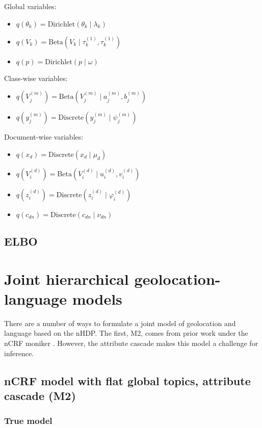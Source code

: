 \documentclass{article}
\newcommand{\Beta}{\ensuremath{\mathrm{Beta}}}
\newcommand{\Dirichlet}{\ensuremath{\mathrm{Dirichlet}}}
\newcommand{\Discrete}{\ensuremath{\mathrm{Discrete}}}
\begin{document}
Global variables:
\begin{itemize}
\item $\displaystyle q(\theta_k) = \Dirichlet(\theta_k \mid \lambda_k)$
\item $\displaystyle q(V_k) = \Beta(V_k \mid \tau_k^{(1)}, \tau_k^{(1)})$
\item $q(p) = \Dirichlet(p \mid \omega)$
\end{itemize}
Class-wise variables:
\begin{itemize}
\item $\displaystyle q(V_j^{(m)}) = \Beta(V_j^{(m)} \mid a_j^{(m)}, b_j^{(m)})$
\item $q(y_j^{(m)}) = \Discrete(y_j^{(m)} \mid \psi_j^{(m)})$
\end{itemize}
Document-wise variables:
\begin{itemize}
\item $q(x_d) = \Discrete(x_d \mid \mu_d)$
\item $\displaystyle q(V_i^{(d)}) = \Beta(V_i^{(d)} \mid u_i^{(d)}, v_i^{(d)})$
\item $q(z_i^{(d)}) = \Discrete(z_i^{(d)} \mid \varphi_i^{(d)})$
\item $\displaystyle q(c_{dn}) = \Discrete(c_{dn} \mid \nu_{dn})$
\end{itemize}


\subsection*{ELBO}



\section*{Joint hierarchical geolocation-language models}

There are a number of ways to formulate a joint model of geolocation and language based on the nHDP.  The first, M2, comes from prior work under the nCRF moniker \cite{ahmed2013,ahmed2013a}.  However, the attribute cascade makes this model a challenge for inference.

\subsection*{nCRF model with flat global topics, attribute cascade (M2)}

\subsubsection*{True model}
\end{document}
